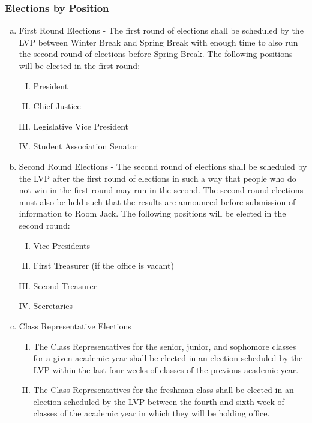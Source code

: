 \documentclass[USletter,12pt]{article}
\begin{document}
\begin{enumerate}[(a)]
\subsubsection{Elections by Position}
\begin{enumerate}[(a)]
\item First Round Elections - The first round of elections shall be scheduled by the LVP between Winter Break and Spring Break with enough time to also run the second round of elections before Spring Break.  The following positions will be elected in the first round:
	\begin{enumerate}[(I)]
	\item President
	\item Chief Justice
	\item Legislative Vice President
	\item Student Association Senator
	\end{enumerate}
\item Second Round Elections - The second round of elections shall be scheduled by the LVP after the first round of elections in such a way that people who do not win in the first round may run in the second.  The second round elections must also be held such that the results are announced before submission of information to Room Jack.  The following positions will be elected in the second round:
	\begin{enumerate}[(I)]
	\item Vice Presidents
	\item First Treasurer (if the office is vacant)
	\item Second Treasurer
	\item Secretaries
	\end{enumerate}
\item Class Representative Elections
	\begin{enumerate}[(I)]
	\item The Class Representatives for the senior, junior, and sophomore classes for a given academic year shall be elected in an election scheduled by the LVP within the last four weeks of classes of the previous academic year.
	\item The Class Representatives for the freshman class shall be elected in an election scheduled by the LVP between the fourth and sixth week of classes of the academic year in which they will be holding office.
	\end{enumerate}
\end{enumerate}



\end{enumerate}
\end{document}

